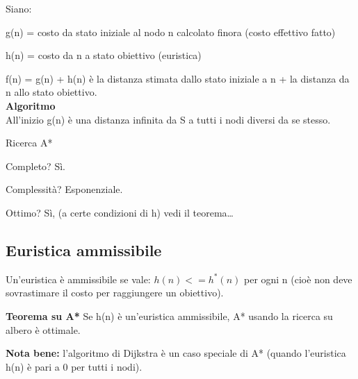 Siano:

g(n) = costo da stato iniziale al nodo n calcolato finora (costo effettivo fatto)

h(n) = costo da n a stato obiettivo (euristica)

f(n) = g(n) + h(n) è la distanza stimata dallo stato iniziale a n + la distanza
da n allo stato obiettivo.\\

\textbf{Algoritmo}\\

All'inizio g(n) è una distanza infinita da S a tutti i nodi diversi da se
stesso.

\begin{algorithm}[H]
    \caption{Ricerca A*}
    \label{alg:algA}
    \begin{algorithmic}[1]
            \State{
            \[
             g(n) = 
              \begin{cases} 
               \infty & \text{if } n \neq S \\
               0    & \text{if } n = S
              \end{cases}
            \]}
              \EndIf
            \EndFor
            \EndWhile
    \end{algorithmic}
\end{algorithm}

Completo? Sì.

Complessità? Esponenziale.

Ottimo? Sì, (a certe condizioni di h) vedi il teorema\dots

\subsection{Euristica ammissibile}

Un'euristica è ammissibile se vale: $h(n) <= h^*(n)$ per ogni n
(cioè non deve sovrastimare il costo per raggiungere un obiettivo).

\textbf{Teorema su A*}
Se h(n) è un'euristica ammissibile,  A* usando la ricerca su albero è ottimale.

\textbf{Nota bene:} l'algoritmo di Dijkstra è un caso speciale di A* (quando
l'euristica h(n) è pari a 0 per tutti i nodi).

